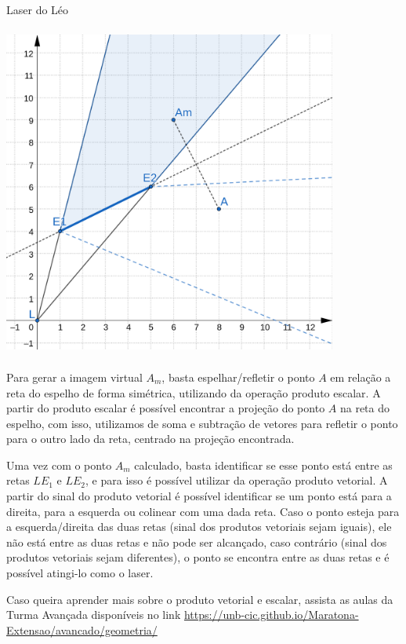 \begin{tutorial}{Laser do Léo}
\begin{center}
\includegraphics[width=11cm, height=11cm]{tutorial2n.png}
\end{center}

Para gerar a imagem virtual $A_m$, basta espelhar/refletir o ponto $A$ em relação a reta do espelho de forma simétrica, utilizando da operação produto escalar. A partir do produto escalar é possível encontrar a projeção do ponto $A$ na reta do espelho, com isso, utilizamos de soma e subtração de vetores para refletir o ponto para o outro lado da reta, centrado na projeção encontrada.


Uma vez com o ponto $A_m$ calculado, basta identificar se esse ponto está entre as retas $LE_1$ e $LE_2$, e para isso é possível utilizar da operação produto vetorial. A partir do sinal do produto vetorial é possível identificar se um ponto está para a direita, para a esquerda ou colinear com uma dada reta. Caso o ponto esteja para a esquerda/direita das duas retas (sinal dos produtos vetoriais sejam iguais), ele não está entre as duas retas e não pode ser alcançado, caso contrário (sinal dos produtos vetoriais sejam diferentes), o ponto se encontra entre as duas retas e é possível atingi-lo como o laser.


Caso queira aprender mais sobre o produto vetorial e escalar, assista as aulas da Turma Avançada disponíveis no link \url{https://unb-cic.github.io/Maratona-Extensao/avancado/geometria/}

\end{tutorial}
